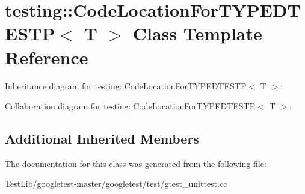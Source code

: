 \hypertarget{classtesting_1_1CodeLocationForTYPEDTESTP}{}\section{testing\+:\+:Code\+Location\+For\+T\+Y\+P\+E\+D\+T\+E\+S\+TP$<$ T $>$ Class Template Reference}
\label{classtesting_1_1CodeLocationForTYPEDTESTP}


Inheritance diagram for testing\+:\+:Code\+Location\+For\+T\+Y\+P\+E\+D\+T\+E\+S\+TP$<$ T $>$\+:


Collaboration diagram for testing\+:\+:Code\+Location\+For\+T\+Y\+P\+E\+D\+T\+E\+S\+TP$<$ T $>$\+:
\subsection*{Additional Inherited Members}


The documentation for this class was generated from the following file\+:\begin{DoxyCompactItemize}
\item 
Test\+Lib/googletest-\/master/googletest/test/gtest\+\_\+unittest.\+cc\end{DoxyCompactItemize}
